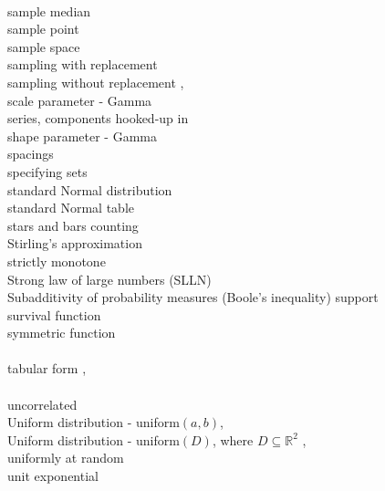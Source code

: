 \documentclass[12pt]{article}
\begin{document}
\\
\noindent sample median \pageref{samplemedian}\\
\noindent sample point \pageref{d:samplepoint}\\
\noindent sample space \pageref{d:samplespace}\\
\noindent sampling with replacement \pageref{sec:samplingwithreplacement}\\
\noindent sampling without replacement \pageref{sec:permutations}, \pageref{samplingwithoutreplacement2}\\
\noindent scale parameter - Gamma \pageref{gammascale}\\
\noindent series, components hooked-up in \pageref{seriesparallel}\\
\noindent shape parameter - Gamma \pageref{gammashape}\\
\noindent spacings \pageref{spacings}\\
\noindent specifying sets \pageref{specify}\\
\noindent standard Normal distribution \pageref{stdnormaldist}\\
\noindent standard Normal table \pageref{standardnormaltable}\\
\noindent stars and bars counting \pageref{starsandbars1}\\
\noindent Stirling's approximation \pageref{stirling}\\
\noindent strictly monotone \pageref{strictlymonotone}\\
\noindent Strong law of large numbers (SLLN) \pageref{slln}\\
\noindent Subadditivity of probability measures (Boole's inequality) \pageref{subadd1}
\noindent support \pageref{d:pmfsupport}\\
\noindent survival function \pageref{survivalfunction}\\
\noindent symmetric function \pageref{symmetricfunction}\\

\\
\noindent tabular form \pageref{e:tabularform}, \pageref{pmftabularform}\\

\\
\noindent uncorrelated \pageref{uncorrelated}\\
\noindent Uniform distribution - uniform$(a,b)$, \pageref{d:uniformabdist}\\
\noindent Uniform distribution - uniform$(D)$, where $D\subseteq {\mathbb R}^2$ \quad \pageref{2duniformexample1}, \pageref{2duniform}\\
\noindent uniformly at random \pageref{uniformlyatrandom1}\\
\noindent unit exponential \pageref{unitexp}\\
\end{document}
